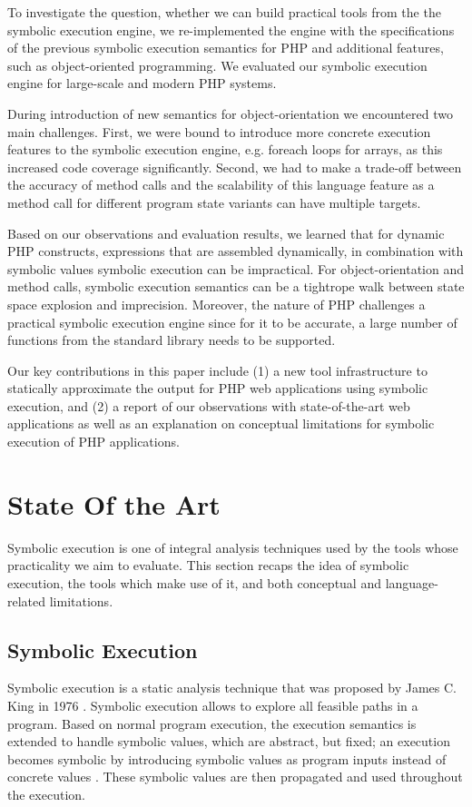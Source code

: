\documentclass[sigconf]{acmart}
\begin{document}
To investigate the question, whether we can build practical tools from the
the symbolic execution engine, we re-implemented the engine with the specifications
of the previous symbolic execution semantics
\cite{Nguyen:2014:BCG:2635868.2635928} for PHP and additional features, such
as object-oriented programming. We evaluated our
symbolic execution engine for large-scale and modern PHP systems.

During introduction of new semantics for object-orientation we encountered two
main challenges. First, we were bound to introduce more concrete execution features to the
symbolic execution engine, e.g. foreach loops for arrays, as this increased
code coverage significantly. Second, we had to make a trade-off between the
accuracy of method calls and the scalability of this language feature as a
method call for different program state variants can have multiple targets.

Based on our observations and evaluation results, we learned that for dynamic
PHP constructs, expressions that are assembled dynamically, in combination with
symbolic values symbolic execution can be impractical. For object-orientation
and method calls, symbolic execution semantics can be a tightrope walk between
state space explosion and imprecision. Moreover, the nature of PHP challenges a
practical symbolic execution engine since for it to be accurate, a large number
of functions from the standard library needs to be supported.

Our key contributions in this paper include (1) a new tool infrastructure to
statically approximate the output for PHP web applications using symbolic
execution, and (2) a report of our observations with state-of-the-art web
applications as well as an explanation on conceptual limitations for symbolic
execution of PHP applications.

\section{State Of the Art}\label{sec:stateoftheart}
Symbolic execution is one of integral analysis techniques used by the tools
whose practicality we aim to evaluate. This section recaps the idea of symbolic
execution, the tools which make use of it, and both conceptual and
language-related limitations.

\subsection{Symbolic Execution}
Symbolic execution is a static analysis technique that was proposed by James C.
King in 1976 \cite{King1976}. Symbolic execution allows to explore all feasible
paths in a program. Based on normal program execution, the execution semantics
is extended to handle symbolic values, which are abstract, but fixed; an
execution becomes symbolic by introducing symbolic values as program inputs
instead of concrete values \cite{King1976,Darringer1978}. These symbolic values
are then propagated and used throughout the execution.
\end{document}
